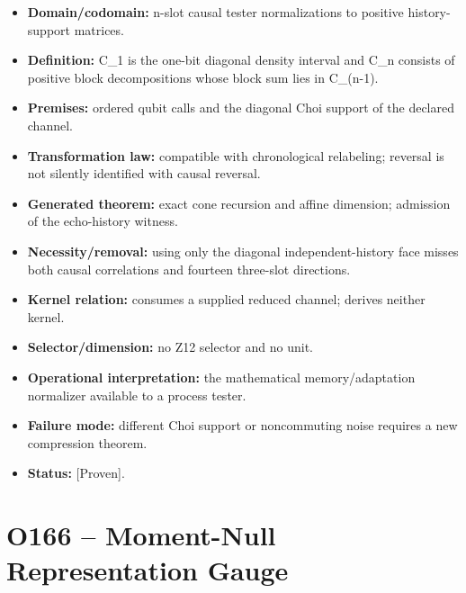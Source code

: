 \documentclass[11pt,a4paper,openany]{report}
\newcommand{\statusProven}{\textcolor{fingreen}{[Proven]}}
\begin{document}
\begin{itemize}
\item 
\textbf{Domain/\allowbreak{}codomain:} n-slot causal tester normalizations to positive history-support matrices.

\item 
\textbf{Definition:} C\_1 is the one-bit diagonal density interval and C\_n consists of positive block decompositions whose block sum lies in C\_(n-1).

\item 
\textbf{Premises:} ordered qubit calls and the diagonal Choi support of the declared channel.

\item 
\textbf{Transformation law:} compatible with chronological relabeling; reversal is not silently identified with causal reversal.

\item 
\textbf{Generated theorem:} exact cone recursion and affine dimension; admission of the echo-history witness.

\item 
\textbf{Necessity/\allowbreak{}removal:} using only the diagonal independent-history face misses both causal correlations and fourteen three-slot directions.

\item 
\textbf{Kernel relation:} consumes a supplied reduced channel; derives neither kernel.

\item 
\textbf{Selector/\allowbreak{}dimension:} no Z12 selector and no unit.

\item 
\textbf{Operational interpretation:} the mathematical memory/\allowbreak{}adaptation normalizer available to a process tester.

\item 
\textbf{Failure mode:} different Choi support or noncommuting noise requires a new compression theorem.

\item 
\textbf{Status:} \statusProven{}.

\end{itemize}

\section{O166 -- Moment-Null Representation Gauge}
\end{document}
